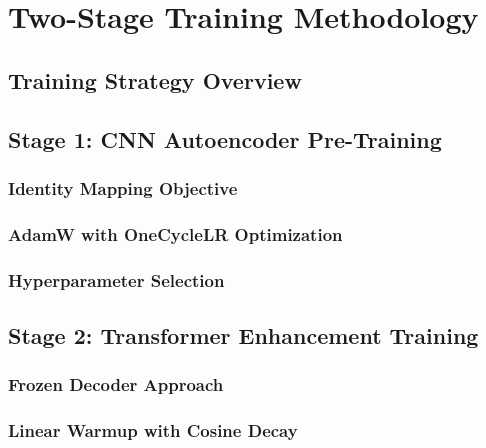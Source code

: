 
\chapter{Two-Stage Training Methodology}

\section{Training Strategy Overview}

\section{Stage 1: CNN Autoencoder Pre-Training}

\subsection{Identity Mapping Objective}

\subsection{AdamW with OneCycleLR Optimization}

\subsection{Hyperparameter Selection}

\section{Stage 2: Transformer Enhancement Training}

\subsection{Frozen Decoder Approach}

\subsection{Linear Warmup with Cosine Decay}


